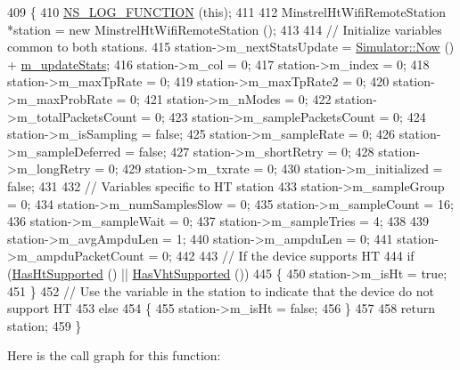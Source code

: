 \begin{DoxyCode}
409 \{
410   \hyperlink{log-macros-disabled_8h_a90b90d5bad1f39cb1b64923ea94c0761}{NS\_LOG\_FUNCTION} (\textcolor{keyword}{this});
411 
412   MinstrelHtWifiRemoteStation *station = \textcolor{keyword}{new} MinstrelHtWifiRemoteStation ();
413 
414   \textcolor{comment}{// Initialize variables common to both stations.}
415   station->m\_nextStatsUpdate = \hyperlink{classns3_1_1Simulator_ac3178fa975b419f7875e7105be122800}{Simulator::Now} () + \hyperlink{classns3_1_1MinstrelHtWifiManager_a5c7d923b77d5cd3a1d38810ed41f91f8}{m\_updateStats};
416   station->m\_col = 0;
417   station->m\_index = 0;
418   station->m\_maxTpRate = 0;
419   station->m\_maxTpRate2 = 0;
420   station->m\_maxProbRate = 0;
421   station->m\_nModes = 0;
422   station->m\_totalPacketsCount = 0;
423   station->m\_samplePacketsCount = 0;
424   station->m\_isSampling = \textcolor{keyword}{false};
425   station->m\_sampleRate = 0;
426   station->m\_sampleDeferred = \textcolor{keyword}{false};
427   station->m\_shortRetry = 0;
428   station->m\_longRetry = 0;
429   station->m\_txrate = 0;
430   station->m\_initialized = \textcolor{keyword}{false};
431 
432   \textcolor{comment}{// Variables specific to HT station}
433   station->m\_sampleGroup = 0;
434   station->m\_numSamplesSlow = 0;
435   station->m\_sampleCount = 16;
436   station->m\_sampleWait = 0;
437   station->m\_sampleTries = 4;
438 
439   station->m\_avgAmpduLen = 1;
440   station->m\_ampduLen = 0;
441   station->m\_ampduPacketCount = 0;
442 
443   \textcolor{comment}{// If the device supports HT}
444   \textcolor{keywordflow}{if} (\hyperlink{classns3_1_1WifiRemoteStationManager_ac792dc8f3c77d507d25de0b87b52608c}{HasHtSupported} () || \hyperlink{classns3_1_1WifiRemoteStationManager_afae2836c7785854272d73bf33e58c95a}{HasVhtSupported} ())
445     \{
450       station->m\_isHt = \textcolor{keyword}{true};
451     \}
452   \textcolor{comment}{// Use the variable in the station to indicate that the device do not support HT}
453   \textcolor{keywordflow}{else}
454     \{
455       station->m\_isHt = \textcolor{keyword}{false};
456     \}
457 
458   \textcolor{keywordflow}{return} station;
459 \}
\end{DoxyCode}


Here is the call graph for this function\+:


